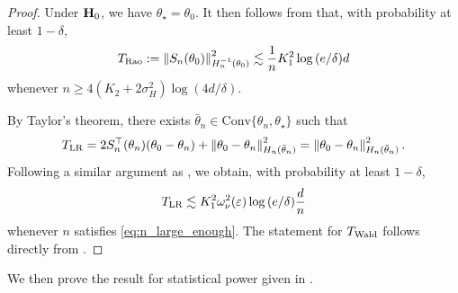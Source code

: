 \begin{proof}
    Under $\mathbf{H}_0$, we have $\theta_\star = \theta_0$.
    It then follows from  that, with probability at least $1 - \delta$,
    \begin{align*}
        T_{\text{Rao}} := \left\lVert S_n(\theta_0) \right\rVert_{H_n^{-1}(\theta_0)}^2 \lesssim \frac1n K_1^2 \log{(e/\delta)} d
    \end{align*}
    whenever $n \ge 4(K_2 + 2\sigma_H^2) \log{(4d/\delta)}$.
    
    By Taylor's theorem, there exists $\bar \theta_n \in \mbox{Conv}\{\theta_n, \theta_\star\}$ such that
    \begin{align*}
        T_{\text{LR}} = 2S_n^\top(\theta_n) (\theta_0 - \theta_n) + \left\lVert \theta_0 - \theta_n \right\rVert_{H_n(\bar \theta_n)}^2 = \left\lVert \theta_0 - \theta_n \right\rVert_{H_n(\bar \theta_n)}^2.
    \end{align*}
    Following a similar argument as , we obtain, with probability at least $1 - \delta$,
    \begin{align*}
        T_{\text{LR}} \lesssim K_1^2 \omega_\nu^2(\varepsilon) \log{(e/\delta)} \frac{d}{n}
    \end{align*}
    whenever $n$ satisfies \eqref{eq:n_large_enough}.
    The statement for $T_{\text{Wald}}$ follows directly from .
\end{proof}

We then prove the result for statistical power given in .

